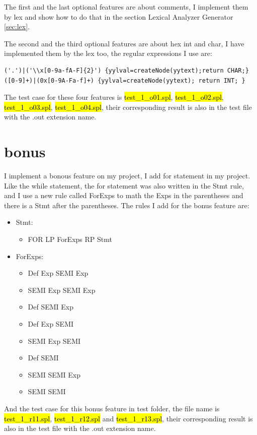 \documentclass{article}
\begin{document}
        The first and the last optional features are about comments, I implement them by lex and show how to do that in the section Lexical Analyzer Generator \ref{sec:lex}.

        The second and the third optional features are about hex int and char, I have implemented them by the lex too, the regular expressions I use are:
        \begin{lstlisting}
('.')|('\\x[0-9a-fA-F]{2}') {yylval=createNode(yytext);return CHAR;}
([0-9]+)|(0x[0-9A-Fa-f]+) {yylval=createNode(yytext); return INT; }
        \end{lstlisting}
        
        The test case for these four features is \hl{test\_1\_o01.spl}, \hl{test\_1\_o02.spl}, \hl{test\_1\_o03.spl}, \hl{test\_1\_o04.spl}, their corresponding result is also in
        the test file with the .out extension name.
    \section{bonus}
        I implement a bonous feature on my project, I add for statement in my project. Like the while statement, the for statement was also written in the Stmt rule, and I use a new rule called
        ForExps to math the Exps in the parentheses and there is a Stmt after the parentheses. The rules I add for the bonus feature are:
        \begin{itemize}
            \item Stmt:
            \begin{itemize}
                \item FOR LP ForExps RP Stmt
            \end{itemize}
            \item ForExps:
            \begin{itemize}
                \item Def Exp SEMI Exp
                \item SEMI Exp SEMI Exp
                \item Def SEMI Exp
                \item Def Exp SEMI
                \item SEMI Exp SEMI
                \item Def SEMI
                \item SEMI SEMI Exp
                \item SEMI SEMI 
            \end{itemize}
        \end{itemize}
        
        And the test case for this bonus feature in test folder, the file name is \hl{test\_1\_r11.spl}, \hl{test\_1\_r12.spl} and \hl{test\_1\_r13.spl}, their corresponding result is also in
        the test file with the .out extension name.
\end{document}
